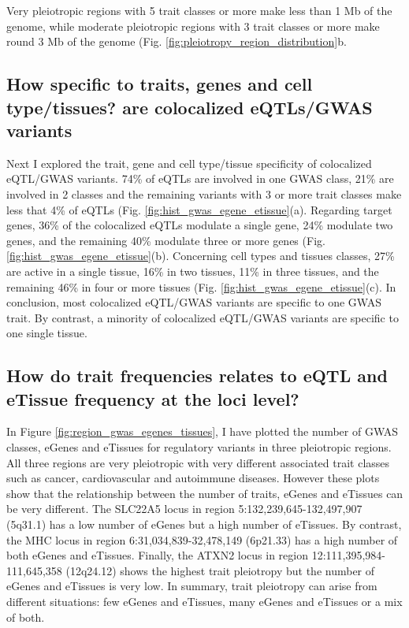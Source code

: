 Very pleiotropic regions with 5 trait classes or more make less than 1 Mb of the genome, while moderate pleiotropic regions with 3 trait classes or more make round 3 Mb of the genome (Fig. \ref{fig:pleiotropy_region_distribution}b.

\subsection*{How specific to traits, genes and cell type/tissues? are colocalized eQTLs/GWAS variants}

Next I explored the trait, gene and cell type/tissue specificity of colocalized eQTL/GWAS variants.
%
74\% of eQTLs are involved in one GWAS class, 21\% are involved in 2 classes and the remaining variants with 3 or more trait classes make less that 4\% of eQTLs (Fig. \ref{fig:hist_gwas_egene_etissue}(a).
%
Regarding target genes, 36\% of the colocalized eQTLs modulate a single gene, 24\% modulate two genes, and the remaining 40\% modulate three or more genes (Fig. \ref{fig:hist_gwas_egene_etissue}(b).
%
Concerning cell types and tissues classes, 27\% are active in a single tissue, 16\% in two tissues, 11\% in three tissues, and the remaining 46\% in four or more tissues (Fig. \ref{fig:hist_gwas_egene_etissue}(c).
%
In conclusion, most colocalized eQTL/GWAS variants are specific to one GWAS trait.
%
By contrast, a minority of colocalized eQTL/GWAS variants are specific to one single tissue.

\subsection*{How do trait frequencies relates to eQTL and eTissue frequency at the loci level?}

In Figure \ref{fig:region_gwas_egenes_tissues}, I have plotted the number of GWAS classes, eGenes and eTissues for regulatory variants in three pleiotropic regions.
%
All three regions are very pleiotropic with very different associated trait classes such as cancer, cardiovascular and autoimmune diseases.
%
However these plots show that the relationship between the number of traits, eGenes and eTissues can be very different.
%
The SLC22A5 locus in region 5:132,239,645-132,497,907 (5q31.1) has a low number of eGenes but a high number of eTissues.
%
By contrast, the MHC locus in region 6:31,034,839-32,478,149 (6p21.33) has a high number of both eGenes and eTissues.
%
Finally, the ATXN2 locus in region 12:111,395,984-111,645,358 (12q24.12) shows the highest trait pleiotropy but the number of eGenes and eTissues is very low.
%
In summary, trait pleiotropy can arise from different situations: few eGenes and eTissues, many eGenes and eTissues or a mix of both.

